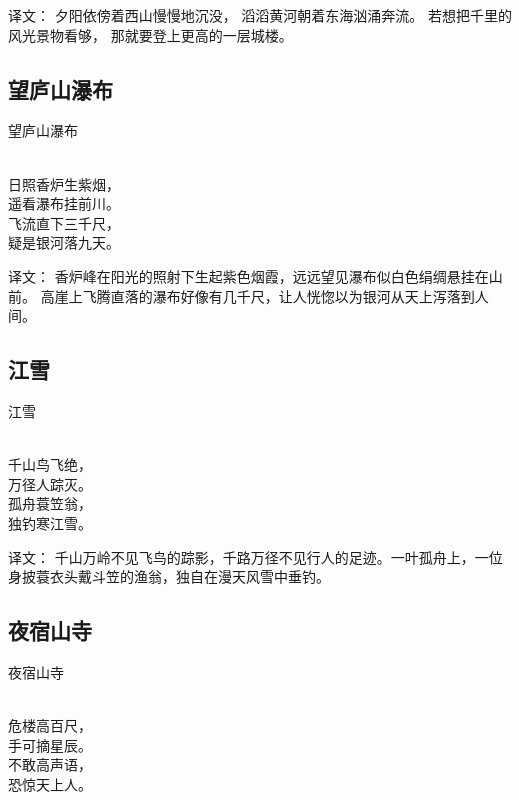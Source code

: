 译文：
夕阳依傍着西山慢慢地沉没， 滔滔黄河朝着东海汹涌奔流。
若想把千里的风光景物看够， 那就要登上更高的一层城楼。

\subsection{望庐山瀑布}
\begin{pinyinscope}
	\noindent \huge 望庐山瀑布
	
	  \\
	
	\noindent 日照香炉生紫烟，\\遥看瀑布挂前川。\\
	飞流直下三千尺，\\疑是银河落九天。
\end{pinyinscope}

译文：
香炉峰在阳光的照射下生起紫色烟霞，远远望见瀑布似白色绢绸悬挂在山前。
高崖上飞腾直落的瀑布好像有几千尺，让人恍惚以为银河从天上泻落到人间。

\subsection{江雪}
\begin{pinyinscope}
	\noindent \huge 江雪
	
	  \\
	
	\noindent 千山鸟飞绝，\\万径人踪灭。\\
	孤舟蓑笠翁，\\独钓寒江雪。
\end{pinyinscope}

译文：
千山万岭不见飞鸟的踪影，千路万径不见行人的足迹。一叶孤舟上，一位身披蓑衣头戴斗笠的渔翁，独自在漫天风雪中垂钓。

\subsection{夜宿山寺}
\begin{pinyinscope}
	\noindent \huge 夜宿山寺
	
	  \\
	
	\noindent 危楼高百尺，\\手可摘星辰。\\
	不敢高声语，\\恐惊天上人。
\end{pinyinscope}

